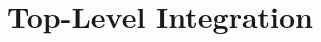 \documentclass[11pt,a4paper]{article}
\newcommand{\placeholderbox}[2]{%
  \begin{center}
    \setlength{\fboxsep}{10pt}\setlength{\fboxrule}{1pt}
    \fbox{\begin{minipage}[c][#1][c]{0.88\textwidth}\centering
      \textbf{\textcolor{red!60!black}{[PLACEHOLDER -- RESULT NOT YET AVAILABLE]}}\\[6pt]
      \small #2
    \end{minipage}}
  \end{center}}
\begin{document}




\vspace{1cm}
\section{Top-Level Integration}
\end{document}
